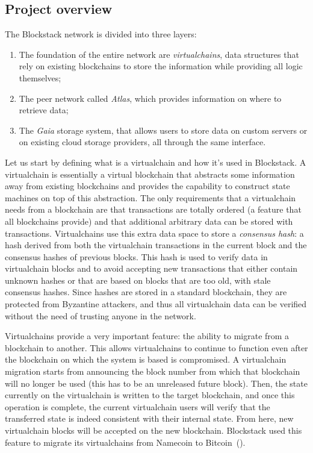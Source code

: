\documentclass[mscthesis]{usiinfthesis}
\begin{document}
\subsection{Project overview}

The Blockstack network is divided into three layers:
\begin{enumerate}
	\item The foundation of the entire network are \emph{virtualchains}, data structures that rely on existing blockchains to store the information while providing all logic themselves;
	\item The peer network called \emph{Atlas}, which provides information on where to retrieve data;
	\item The \emph{Gaia} storage system, that allows users to store data on custom servers or on existing cloud storage providers, all through the same interface.
\end{enumerate}

Let us start by defining what is a virtualchain and how it's used in Blockstack. A virtualchain is essentially a virtual blockchain that abstracts some information away from existing blockchains and provides the capability to construct state machines on top of this abstraction. The only requirements that a virtualchain needs from a blockchain are that transactions are totally ordered (a feature that all blockchains provide) and that additional arbitrary data can be stored with transactions. Virtualchains use this extra data space to store a \emph{consensus hash}: a hash derived from both the virtualchain transactions in the current block and the consensus hashes of previous blocks. This hash is used to verify data in virtualchain blocks and to avoid accepting new transactions that either contain unknown hashes or that are based on blocks that are too old, with stale consensus hashes. Since hashes are stored in a standard blockchain, they are protected from Byzantine attackers, and thus all virtualchain data can be verified without the need of trusting anyone in the network.

Virtualchains provide a very important feature: the ability to migrate from a blockchain to another. This allows virtualchains to continue to function even after the blockchain on which the system is based is compromised. A virtualchain migration starts from announcing the block number from which that blockchain will no longer be used (this has to be an unreleased future block). Then, the state currently on the virtualchain is written to the target blockchain, and once this operation is complete, the current virtualchain users will verify that the transferred state is indeed consistent with their internal state. From here, new virtualchain blocks will be accepted on the new blockchain. Blockstack used this feature to migrate its virtualchains from Namecoin to Bitcoin~(\cite{website:blockstackmigration}).
\end{document}
